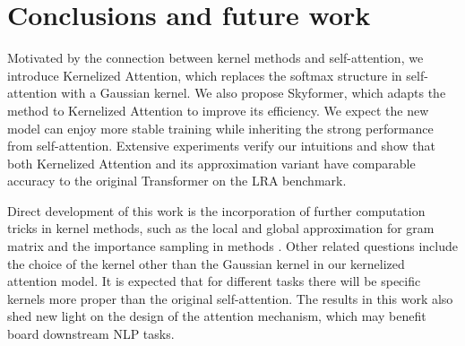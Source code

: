 \section{Conclusions and future work}

Motivated by the connection between kernel methods and self-attention, 
we introduce Kernelized Attention, which replaces the softmax structure in self-attention with a Gaussian kernel.
We also propose Skyformer, which adapts the \nystrom method to Kernelized Attention to improve its efficiency.
We expect the new model can enjoy more stable training while inheriting the strong performance from self-attention.
Extensive experiments verify our intuitions and show that both Kernelized Attention and its \nystrom approximation variant have comparable accuracy to the original Transformer on the LRA benchmark.

Direct development of this work is the incorporation of further computation tricks in kernel methods, such as the local and global approximation for gram matrix \citep{snelson2007local} and the importance sampling in \nystrom methods \citep{DBLP:conf/nips/MuscoM17, chen2021fast, chen2021accumulations}.
Other related questions include the choice of the kernel other than the Gaussian kernel in our kernelized attention model.
It is expected that for different tasks there will be specific kernels more proper than the original self-attention.
The results in this work also shed new light on the design of the attention mechanism, which may benefit board downstream NLP tasks.









